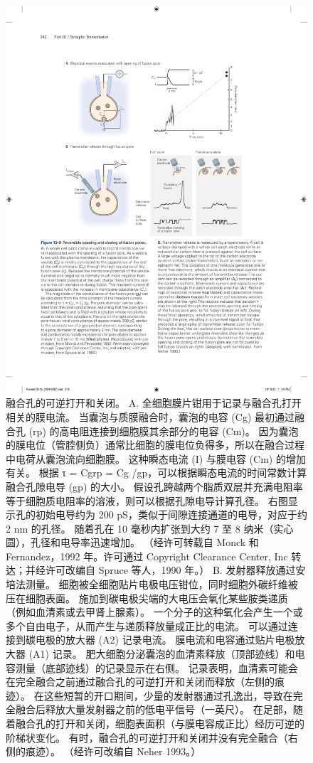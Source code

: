 \begin{figure}[htbp]
	\centering
	\includegraphics[width=0.7\linewidth]{chap15/fig_15_9}
	\caption{融合孔的可逆打开和关闭。 A. 全细胞膜片钳用于记录与融合孔打开相关的膜电流。 当囊泡与质膜融合时，囊泡的电容 (Cg) 最初通过融合孔 (rp) 的高电阻连接到细胞膜其余部分的电容 (Cm)。 因为囊泡的膜电位（管腔侧负）通常比细胞的膜电位负得多，所以在融合过程中电荷从囊泡流向细胞膜。 这种瞬态电流 (I) 与膜电容 (Cm) 的增加有关。 根据 τ = Cgrp = Cg /gp，可以根据瞬态电流的时间常数计算融合孔隙电导 (gp) 的大小。 假设孔跨越两个脂质双层并充满电阻率等于细胞质电阻率的溶液，则可以根据孔隙电导计算孔径。 右图显示孔的初始电导约为 200 pS，类似于间隙连接通道的电导，对应于约 2 nm 的孔径。 随着孔在 10 毫秒内扩张到大约 7 至 8 纳米（实心圆），孔径和电导率迅速增加。 （经许可转载自 Monck 和 Fernandez，1992 年。许可通过 Copyright Clearance Center, Inc 转达；并经许可改编自 Spruce 等人，1990 年。） B. 发射器释放通过安培法测量。 细胞被全细胞贴片电极电压钳位，同时细胞外碳纤维被压在细胞表面。 施加到碳电极尖端的大电压会氧化某些胺类递质（例如血清素或去甲肾上腺素）。 一个分子的这种氧化会产生一个或多个自由电子，从而产生与递质释放量成正比的电流。 可以通过连接到碳电极的放大器 (A2) 记录电流。 膜电流和电容通过贴片电极放大器 (A1) 记录。 肥大细胞分泌囊泡的血清素释放（顶部迹线）和电容测量（底部迹线）的记录显示在右侧。 记录表明，血清素可能会在完全融合之前通过融合孔的可逆打开和关闭而释放（左侧的痕迹）。 在这些短暂的开口期间，少量的发射器通过孔逸出，导致在完全融合后释放大量发射器之前的低电平信号（一英尺）。 在足部，随着融合孔的打开和关闭，细胞表面积（与膜电容成正比）经历可逆的阶梯状变化。 有时，融合孔的可逆打开和关闭并没有完全融合（右侧的痕迹）。 （经许可改编自 Neher 1993。）}
	\label{fig:15_9}
\end{figure}


